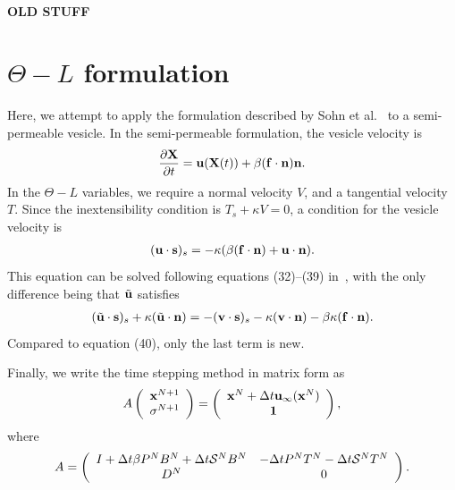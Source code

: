 \documentclass[aps,prl,showpacs]{revtex4}
\begin{document}
 
 




 \newpage
 \paragraph{\bf \Huge OLD STUFF}

\section{{$\Theta-L$} formulation}
Here, we attempt to apply the formulation described by Sohn et
al.~\cite{soh-tse-li-voi-low2010} to a semi-permeable vesicle.  In the
semi-permeable formulation, the vesicle velocity is
\begin{align}
  \frac{\partial \mathbf{X}}{\partial t} = \mathbf{u}(\mathbf{X}(t)) + \beta (\mathbf{f} \cdot \mathbf{n}) \mathbf{n}.
\end{align}
In the {$\Theta-L$} variables, we require a normal velocity $V$, and a
tangential velocity $T$. Since the inextensibility condition is $T_s +
\kappa V = 0$, a condition for the vesicle velocity is
\begin{align}
  (\mathbf{u} \cdot \mathbf{s})_s = -\kappa(\beta (\mathbf{f} \cdot \mathbf{n}) + 
      \mathbf{u} \cdot \mathbf{n}).
\end{align}
This equation can be solved following equations (32)--(39)
in~\cite{soh-tse-li-voi-low2010}, with the only difference being that
$\tilde{\mathbf{u}}$ satisfies
\begin{align}
  (\tilde{\mathbf{u}} \cdot \mathbf{s})_s + \kappa(\tilde{\mathbf{u}} \cdot \mathbf{n}) =
    -(\mathbf{v} \cdot \mathbf{s})_s - \kappa(\mathbf{v} \cdot \mathbf{n}) 
    - \beta\kappa(\mathbf{f} \cdot \mathbf{n}).
\end{align}
Compared to equation (40), only the last term is new.


Finally, we write the time stepping method in matrix form as
\begin{align}
  A \left(
    \begin{array}{c}
      \mathbf{x}^{N+1} \\ \sigma^{N+1}
    \end{array}
  \right) = 
  \left(
    \begin{array}{c}
      \mathbf{x}^{N} + \Delta t \mathbf{u}_\infty(\mathbf{x}^N) \\ \mathbf{1}
    \end{array}
  \right),
\end{align}
where
\begin{align}
 A = \left(
  \begin{array}{cc}
    I + \Delta t \beta P^N B^N + \Delta t \mathcal{S}^N B^N & 
    -\Delta t P^N T^N - \Delta t \mathcal{S}^N T^N \\
    D^N & 0
  \end{array}
  \right).
\end{align}
\end{document}
